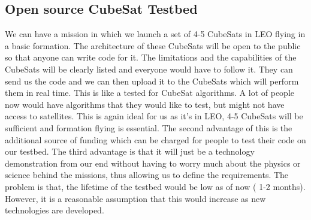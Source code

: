 \subsection{Open source CubeSat Testbed}
\label{testbed}
We can have a mission in which we launch a set of 4-5 CubeSats in LEO flying in a basic formation. The architecture of these CubeSats will be open to the public so that anyone can write code for it. The limitations and the capabilities of the CubeSats will be clearly listed and everyone would have to follow it. They can send us the code and we can then upload it to the CubeSats which will perform them in real time. This is like a tested for CubeSat algorithms. A lot of people now would have algorithms that they would like to test, but might not have access to satellites. This is again ideal for us as it's in LEO, 4-5 CubeSats will be sufficient and formation  flying is essential. The second advantage of this is the additional source of funding which can be charged for people to test their code on our testbed. The third advantage is that it will just be a technology demonstration from our end without having to worry much about the physics or science behind the missions, thus allowing us to define the requirements. The problem is that, the lifetime of the testbed would be low as of now ( 1-2 months). However, it is a reasonable assumption that this would increase as new technologies are developed.

